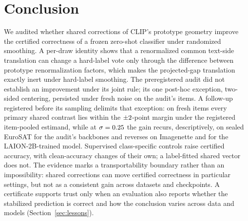 \section{Conclusion}
\label{sec:conclusion}

We audited whether shared corrections of CLIP's prototype geometry improve the
certified correctness of a frozen zero-shot classifier under randomized
smoothing. A per-draw identity shows that a renormalized common text-side
translation can change a hard-label vote only through the difference between
prototype renormalization factors, which makes the projected-gap translation
exactly inert under hard-label smoothing. The preregistered audit did not
establish an improvement under its joint rule; its one post-hoc exception,
two-sided centering, persisted under fresh noise on the audit's items. A
follow-up registered before its sampling delimits that exception: on fresh
items every primary shared contrast lies within the $\pm2$-point margin
under the registered item-pooled estimand, while at $\sigma=0.25$ the
gain recurs, descriptively, on sealed EuroSAT for the audit's backbones and
reverses on Imagenette and for the LAION-2B-trained model. Supervised
class-specific controls raise certified accuracy, with clean-accuracy changes
of their own; a label-fitted shared vector does not. The evidence marks a
transportability boundary rather than an impossibility: shared corrections can
move certified correctness in particular settings, but not as a consistent
gain across datasets and checkpoints. A certificate supports trust only when an
evaluation also reports whether the stabilized prediction is correct and how
the conclusion varies across data and models
(Section~\ref{sec:lessons}).\label{body:end}%
